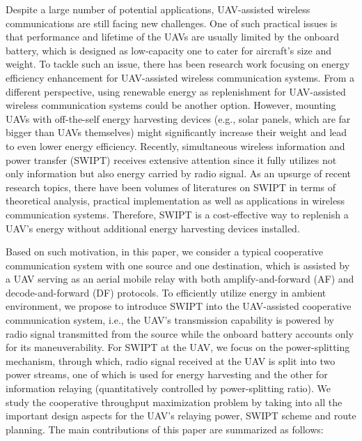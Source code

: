 \documentclass[12pt, draftclsnofoot, onecolumn]{IEEEtran}
\begin{document}
Despite a large number of potential applications, UAV-assisted wireless communications are still facing new challenges. One of such practical issues is that performance and lifetime of the UAVs are usually limited by the onboard battery, which is designed as low-capacity one to cater for aircraft's size and weight. To tackle such an issue, there has been research work focusing on energy efficiency enhancement for UAV-assisted wireless communication systems\cite{7888557}\cite{7997208}. From a different perspective, using renewable energy as replenishment for UAV-assisted wireless communication systems could be another option. However, mounting UAVs with off-the-self energy harvesting devices (e.g., solar panels, which are far bigger than UAVs themselves) might significantly increase their weight and lead to even lower energy efficiency. Recently, simultaneous wireless information and power transfer (SWIPT) receives extensive attention since it fully utilizes not only information but also energy carried by radio signal. As an upsurge of recent research topics, there have been volumes of literatures on SWIPT in terms of theoretical analysis\cite{4595260}\cite{5513714}, practical implementation\cite{6567869}\cite{6804407} as well as applications in wireless communication systems\cite{6661329}\cite{6589954}. Therefore, SWIPT is a cost-effective way to replenish a UAV's energy without additional energy harvesting devices installed. 

Based on such motivation, in this paper, we consider a typical cooperative communication system with one source and one destination, which is assisted by a UAV serving as an aerial mobile relay with both amplify-and-forward (AF) and decode-and-forward (DF) protocols. To efficiently utilize energy in ambient environment, we propose to introduce SWIPT into the UAV-assisted cooperative communication system, i.e., the UAV's transmission capability is powered by radio signal transmitted from the source while the onboard battery accounts only for its maneuverability. For SWIPT at the UAV, we focus on the power-splitting mechanism, through which, radio signal received at the UAV is split into two power streams, one of which is used for energy harvesting and the other for information relaying (quantitatively controlled by power-splitting ratio). We study the cooperative throughput maximization problem by taking into all the important design aspects for the UAV's relaying power, SWIPT scheme and route planning. The main contributions of this paper are summarized as follows:
\end{document}
